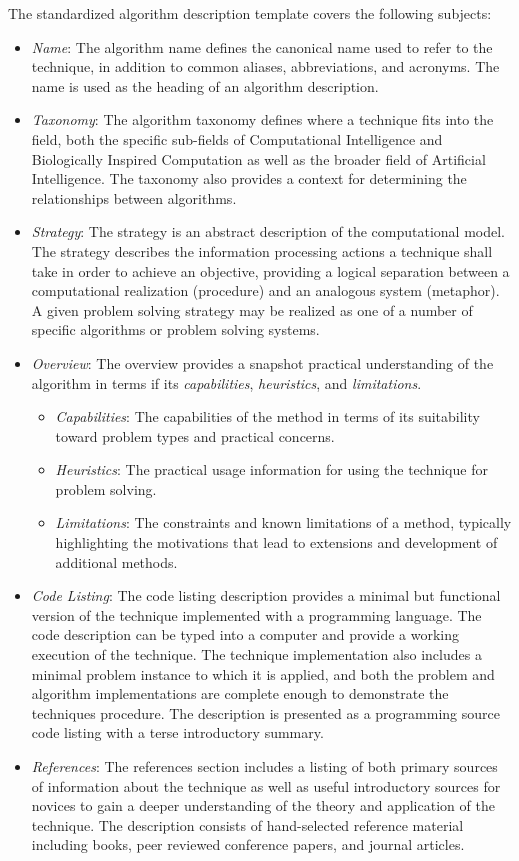 The standardized algorithm description template covers the following subjects:
\begin{itemize}
	\item \emph{Name}: The algorithm name defines the canonical name used to refer to the technique, in addition to common aliases, abbreviations, and acronyms. The name is used as the heading of an algorithm description.
	\item \emph{Taxonomy}: The algorithm taxonomy defines where a technique fits into the field, both the specific sub-fields of Computational Intelligence and Biologically Inspired Computation as well as the broader field of Artificial Intelligence. The taxonomy also provides a context for determining the relationships between algorithms.
	\item \emph{Strategy}: The strategy is an abstract description of the computational model. The strategy describes the information processing actions a technique shall take in order to achieve an objective, providing a logical separation between a computational realization (procedure) and an analogous system (metaphor). A given problem solving strategy may be realized as one of a number of specific algorithms or problem solving systems.
	\item \emph{Overview}: The overview provides a snapshot practical understanding of the algorithm in terms if its \emph{capabilities}, \emph{heuristics}, and \emph{limitations}.
	 \begin{itemize}
			\item \emph{Capabilities}: The capabilities of the method in terms of its suitability toward problem types and practical concerns.
			\item \emph{Heuristics}: The practical usage information for using the technique for problem solving. 
			\item \emph{Limitations}: The constraints and known limitations of a method, typically highlighting the motivations that lead to extensions and development of additional methods.
		\end{itemize}
	\item \emph{Code Listing}: The code listing description provides a minimal but functional version of the technique implemented with a programming language. The code description can be typed into a computer and provide a working execution of the technique. The technique implementation also includes a minimal problem instance to which it is applied, and both the problem and algorithm implementations are complete enough to demonstrate the techniques procedure. The description is presented as a programming source code listing with a terse introductory summary.
	\item \emph{References}: The references section includes a listing of both primary sources of information about the technique as well as useful introductory sources for novices to gain a deeper understanding of the theory and application of the technique. The description consists of hand-selected reference material including books, peer reviewed conference papers, and journal articles.
\end{itemize}


